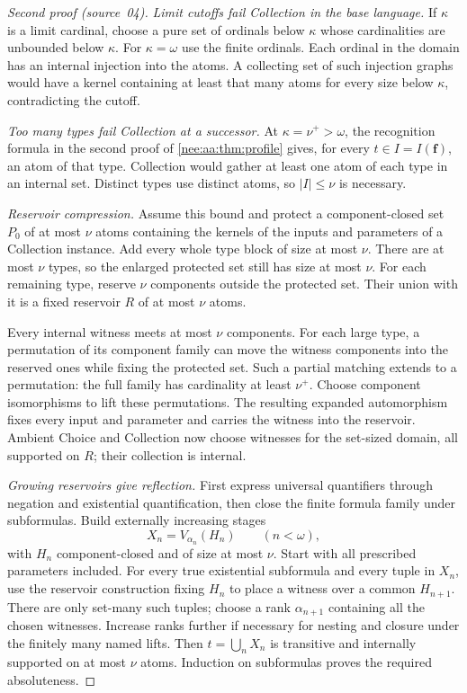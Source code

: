 \documentclass[11pt,letterpaper]{article}
\numberwithin{equation}{section}
\theoremstyle{plain}
\theoremstyle{definition}
\theoremstyle{remark}
\begin{document}
\begin{proof}[Second proof (source~04)]
\emph{Limit cutoffs fail Collection in the base language.}
If $\kappa$ is a limit cardinal, choose a pure set of
ordinals below $\kappa$ whose cardinalities are
unbounded below $\kappa$. For $\kappa=\omega$ use
the finite ordinals. Each ordinal in the domain has an
internal injection into the atoms. A collecting set of
such injection graphs would have a kernel containing
at least that many atoms for every size below $\kappa$,
contradicting the cutoff.

\emph{Too many types fail Collection at a successor.}
At $\kappa=\nu^+>\omega$, the recognition formula in
the second proof of \cref{nee:aa:thm:profile} gives, for every $t\in I=I(\boldsymbol f)$, an atom
of that type. Collection would gather at least one atom
of each type in an internal set. Distinct types use
distinct atoms, so $|I|\leq\nu$ is necessary.

\emph{Reservoir compression.}
Assume this bound and protect a component-closed set
$P_0$ of at most $\nu$ atoms containing the kernels
of the inputs and parameters of a Collection instance.
Add every whole type block of size at most $\nu$.
There are at most $\nu$ types, so the enlarged protected
set still has size at most $\nu$.
For each remaining type, reserve $\nu$ components
outside the protected set. Their union with it is a
fixed reservoir $R$ of at most $\nu$ atoms.

Every internal witness meets at most $\nu$ components.
For each large type, a permutation of its component
family can move the witness components into the reserved
ones while fixing the protected set. Such a partial
matching extends to a permutation: the full family
has cardinality at least $\nu^+$.
Choose component isomorphisms to lift these permutations.
The resulting expanded automorphism fixes every input
and parameter and carries the witness into the reservoir.
Ambient Choice and Collection now choose witnesses for
the set-sized domain, all supported on $R$; their
collection is internal.

\emph{Growing reservoirs give reflection.}
First express universal quantifiers through negation and existential
quantification, then close the finite formula family under subformulas.
Build externally increasing stages
\[
X_n=V_{\alpha_n}(H_n)\qquad(n<\omega),
\]
with $H_n$ component-closed and of size at most $\nu$.
Start with all prescribed parameters included.
For every true existential subformula and every tuple
in $X_n$, use the reservoir construction fixing $H_n$
to place a witness over a common $H_{n+1}$.
There are only set-many such tuples; choose a rank
$\alpha_{n+1}$ containing all the chosen witnesses.
Increase ranks further if necessary for nesting and
closure under the finitely many named lifts.
Then $t=\bigcup_nX_n$ is transitive and internally
supported on at most $\nu$ atoms. Induction on
subformulas proves the required absoluteness.


\end{proof}
\end{document}
